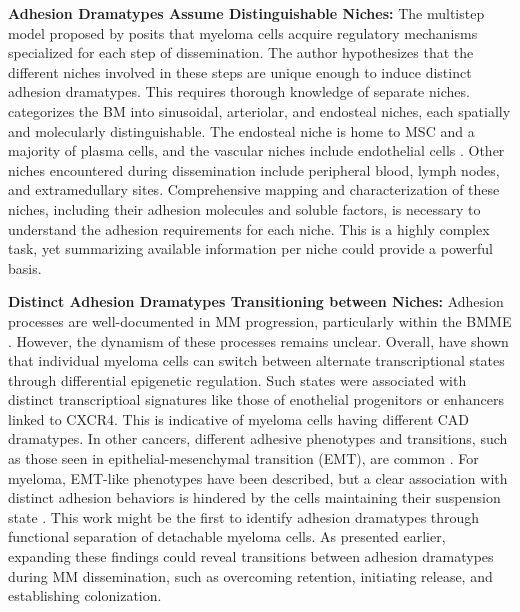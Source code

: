 \textbf{Adhesion Dramatypes Assume Distinguishable Niches:} The multistep
model proposed by \citet{zeissigTumourDisseminationMultiple2020} posits that
myeloma cells acquire regulatory mechanisms specialized for each step of
dissemination. The author hypothesizes that the different niches involved in
these steps are unique enough to induce distinct adhesion dramatypes. This
requires thorough knowledge of separate niches.
\citet{granataBoneMarrowNiches2022} categorizes the \ac{BM} into sinusoidal,
arteriolar, and endosteal niches, each spatially and molecularly
distinguishable. The endosteal niche is home to \ac{MSC} and a majority of
plasma cells, and the vascular niches
 include endothelial cells
\cite{zehentmeierStaticDynamicComponents2014, wilmoreHereThereAnywhere2017}.
Other niches encountered during dissemination include peripheral blood, lymph
nodes, and extramedullary sites. Comprehensive mapping and characterization of
these niches, including their adhesion molecules and soluble factors, is
necessary to understand the adhesion requirements for each niche. This is a
highly complex task, yet summarizing available information per niche could
provide a powerful basis.


\textbf{Distinct Adhesion Dramatypes Transitioning between Niches:}
Adhesion processes are well-documented in MM progression, particularly within
the \ac{BMME} \cite{bouzerdanAdhesionMoleculesMultiple2022}. However, the
dynamism of these processes remains unclear. Overall,
\citet{fredeDynamicTranscriptionalReprogramming2021} have shown that individual
myeloma cells can switch between alternate transcriptional states through
differential epigenetic regulation. Such states were associated with distinct
transcriptioal signatures like those of enothelial progenitors or enhancers
linked to CXCR4. This is indicative of myeloma cells having different \ac{CAD}
dramatypes. In other cancers, different adhesive phenotypes and transitions,
such as those seen in epithelial-mesenchymal transition (EMT), are common
\cite{gengDynamicSwitchTwo2014}. For myeloma, EMT-like phenotypes have been
described, but a clear association with distinct adhesion behaviors is hindered
by the cells maintaining their suspension state
\cite{roccaroCXCR4RegulatesExtraMedullary2015,
      qianSETDB1InducesLenalidomide2023}. This work might be the first to identify
adhesion dramatypes through functional separation of detachable myeloma cells.
As presented earlier, expanding these findings could reveal transitions between
adhesion dramatypes during MM dissemination, such as overcoming retention,
initiating release, and establishing colonization.


